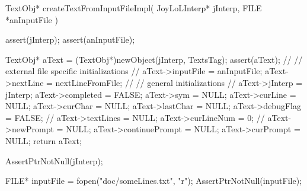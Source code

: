 \startCCode
TextObj* createTextFromInputFileImpl(
  JoyLoLInterp* jInterp,
  FILE *anInputFile
) {
  assert(jInterp);
  assert(anInputFile);
  
  TextObj* aText = (TextObj*)newObject(jInterp, TextsTag);
  assert(aText);
  //
  // external file specific initializations
  //
  aText->inputFile  = anInputFile;
  aText->nextLine   = nextLineFromFile;
  //
  // general initializations
  //
  aText->jInterp    = jInterp;
  aText->completed  = FALSE;
  aText->sym        = NULL;
  aText->curLine    = NULL;
  aText->curChar    = NULL;
  aText->lastChar   = NULL;
  aText->debugFlag  = FALSE;
  //
  aText->textLines  = NULL;
  aText->curLineNum = 0;
  //
  aText->newPrompt      = NULL;
  aText->continuePrompt = NULL;
  aText->curPrompt      = NULL;
  return aText;
}
\stopCCode

\startCTest
  AssertPtrNotNull(jInterp);

  FILE* inputFile = fopen("doc/someLines.txt", "r");
  AssertPtrNotNull(inputFile);
  
